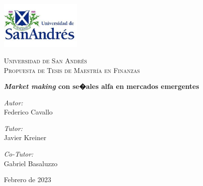 \documentclass[12pt,a4paper,spanish]{article}%
\begin{document}
\begin{titlepage}

\includegraphics[width=0.3\textwidth]{LogoUDESA} \\[2cm]    

\begin{center}

\textsc{\LARGE Universidad de San Andr\'{e}s}\\[1.0cm]

\textsc{\Large Propuesta de Tesis de Maestr\'{i}a en Finanzas}
\\[2.5cm]


\doublespacing

{ \Large \bfseries \textit{Market making} con se�ales alfa en mercados emergentes}\\[0.4cm]

\vspace{4cm}

\bigskip
\bigskip
\begin{singlespace}

\begin{minipage}{0.45\textwidth}
\begin{flushleft} \large
\emph{Autor:}\\
Federico Cavallo
\end{flushleft}
\end{minipage}
\begin{minipage}{0.45\textwidth}
\begin{flushright} \large
\emph{Tutor:} \\
Javier Kreiner

\emph{Co-Tutor:} \\
Gabriel Basaluzzo
\end{flushright}
\end{minipage}

\end{singlespace}

\vfill

{\large Febrero de 2023}

\end{center}

\end{titlepage}
\end{document}

